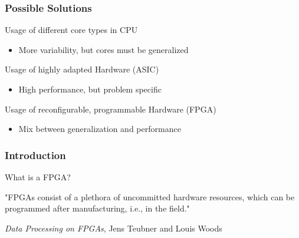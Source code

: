 \documentclass{beamer}
\begin{document}
\begin{frame}
	\frametitle{Possible Solutions}
	Usage of different core types in CPU
	\begin{itemize}
		\item More variability, but cores must be generalized
	\end{itemize}
	\vspace*{0.5cm}%
	Usage of highly adapted Hardware (ASIC)
	\begin{itemize}
		\item High performance, but problem specific
	\end{itemize}
	\vspace*{0.5cm}%
	Usage of reconfigurable, programmable Hardware (FPGA)
	\begin{itemize} 
		\item Mix between generalization and performance
	\end{itemize}
\end{frame}

\begin{frame}
	\frametitle{Introduction}
	\begin{center}
		\huge What is a FPGA?
	\end{center}
	
	"FPGAs consist of a plethora of uncommitted hardware resources, which can be
	programmed after manufacturing, i.e., in the field."
	\vspace*{3cm}
	\begin{center}
		\small \emph{Data Processing on FPGAs}, Jens Teubner and Louis Woods 
	\end{center}
\end{frame}
\end{document}
